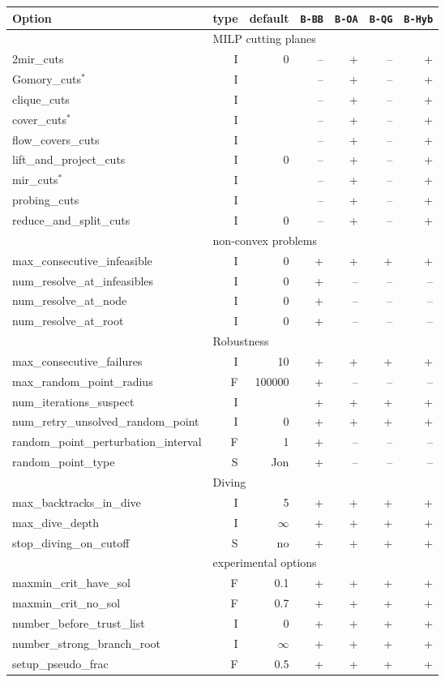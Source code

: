 \begin{center}
\begin{tabular}{|l|r|r|r|r|r|r|}\hline
Option & type &  default & {\tt B-BB} & {\tt B-OA} & {\tt B-QG} & {\tt B-Hyb} \\
\hline
\hline
\multicolumn{1}{|c}{} & \multicolumn{6}{l|}{MILP cutting planes}\\
\hline
2mir\_cuts& I& 0& --& +& --& +\\
Gomory\_cuts$^*$& I& \-5& --& +& --& +\\
clique\_cuts& I& \-5& --& +& --& +\\
cover\_cuts$^*$& I& \-5& --& +& --& +\\
flow\_covers\_cuts& I& \-5& --& +& --& +\\
lift\_and\_project\_cuts& I& 0& --& +& --& +\\
mir\_cuts$^*$& I& \-5& --& +& --& +\\
probing\_cuts& I& \-5& --& +& --& +\\
reduce\_and\_split\_cuts& I& 0& --& +& --& +\\
\hline
\multicolumn{1}{|c}{} & \multicolumn{6}{l|}{non-convex problems}\\
\hline
max\_consecutive\_infeasible& I& 0& +& +& +& +\\
num\_resolve\_at\_infeasibles& I& 0& +& --& --& --\\
num\_resolve\_at\_node& I& 0& +& --& --& --\\
num\_resolve\_at\_root& I& 0& +& --& --& --\\
\hline
\multicolumn{1}{|c}{} & \multicolumn{6}{l|}{Robustness}\\
\hline
max\_consecutive\_failures& I& 10& +& +& +& +\\
max\_random\_point\_radius& F& 100000& +& --& --& --\\
num\_iterations\_suspect& I& \-1& +& +& +& +\\
num\_retry\_unsolved\_random\_point& I& 0& +& +& +& +\\
random\_point\_perturbation\_interval& F& 1& +& --& --& --\\
random\_point\_type& S& Jon& +& --& --& --\\
\hline
\multicolumn{1}{|c}{} & \multicolumn{6}{l|}{Diving}\\
\hline
max\_backtracks\_in\_dive& I& 5& +& +& +& +\\
max\_dive\_depth& I& $\infty$& +& +& +& +\\
stop\_diving\_on\_cutoff& S& no& +& +& +& +\\
\hline
\multicolumn{1}{|c}{} & \multicolumn{6}{l|}{experimental options}\\
\hline
maxmin\_crit\_have\_sol& F& 0.1& +& +& +& +\\
maxmin\_crit\_no\_sol& F& 0.7& +& +& +& +\\
number\_before\_trust\_list& I& 0& +& +& +& +\\
number\_strong\_branch\_root& I& $\infty$& +& +& +& +\\
setup\_pseudo\_frac& F& 0.5& +& +& +& +\\
\hline
\end{tabular}
\end{center}

